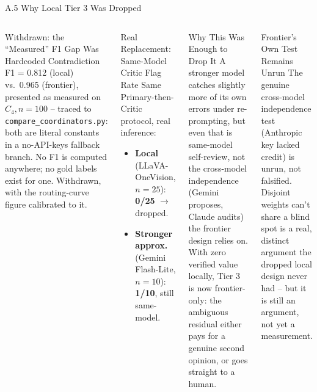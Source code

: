 \documentclass[aspectratio=169,11pt]{beamer}
\begin{document}
\begin{frame}{A.5 Why Local Tier 3 Was Dropped}
\scriptsize
\begin{columns}[T]
\begin{alertblock}{Withdrawn: the ``Measured'' F1 Gap Was Hardcoded}
\scriptsize Contradiction F1 = 0.812 (local) vs.\ 0.965 (frontier), presented as measured on $C_4, n{=}100$ -- traced to \texttt{compare\_coordinators.py}: both are literal constants in a no-API-keys fallback branch. No F1 is computed anywhere; no gold labels exist for one. Withdrawn, with the routing-curve figure calibrated to it.
\end{alertblock}

\begin{block}{Real Replacement: Same-Model Critic Flag Rate}
\scriptsize Same Primary-then-Critic protocol, real inference:
\begin{itemize}
  \item \textbf{Local} (LLaVA-OneVision, $n=25$): \textbf{0/25} $\rightarrow$ dropped.
  \item \textbf{Stronger approx.} (Gemini Flash-Lite, $n=10$): \textbf{1/10}, still same-model.
\end{itemize}
\end{block}

\begin{block}{Why This Was Enough to Drop It}
\scriptsize A stronger model catches slightly more of its own errors under re-prompting, but even that is same-model self-review, not the cross-model independence (Gemini proposes, Claude audits) the frontier design relies on. With zero verified value locally, Tier 3 is now frontier-only: the ambiguous residual either pays for a genuine second opinion, or goes straight to a human.
\end{block}
\begin{block}{Frontier's Own Test Remains Unrun}
\scriptsize The genuine cross-model independence test (Anthropic key lacked credit) is unrun, not falsified. Disjoint weights can't share a blind spot is a real, distinct argument the dropped local design never had -- but it is still an argument, not yet a measurement.
\end{block}
\end{columns}
\end{frame}
\end{document}
